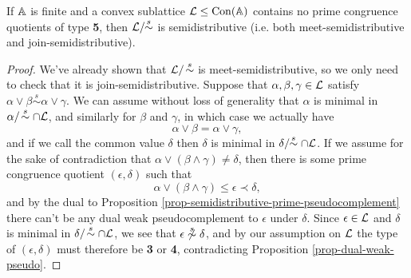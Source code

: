 \begin{appendices}
\begin{thm} If $\mathbb{A}$ is finite and a convex sublattice $\mathcal{L} \le \operatorname{Con}(\mathbb{A})$ contains no prime congruence quotients of type \textbf{5}, then $\mathcal{L}/\!\!\stackrel{s}{\sim}$ is semidistributive (i.e. both meet-semidistributive and join-semidistributive).
\end{thm}
\begin{proof} We've already shown that $\mathcal{L}/\!\stackrel{s}{\sim}$ is meet-semidistributive, so we only need to check that it is join-semidistributive. Suppose that $\alpha, \beta, \gamma \in \mathcal{L}$ satisfy $\alpha \vee \beta \stackrel{s}{\sim} \alpha \vee \gamma$. We can assume without loss of generality that $\alpha$ is minimal in $\alpha/\!\stackrel{s}{\sim} \cap \mathcal{L}$, and similarly for $\beta$ and $\gamma$, in which case we actually have
\[
\alpha \vee \beta = \alpha \vee \gamma,
\]
and if we call the common value $\delta$ then $\delta$ is minimal in $\delta/\!\!\stackrel{s}{\sim} \cap \mathcal{L}$. If we assume for the sake of contradiction that $\alpha \vee (\beta \wedge \gamma) \ne \delta$, then there is some prime congruence quotient $(\epsilon,\delta)$ such that
\[
\alpha \vee (\beta \wedge \gamma) \le \epsilon \prec \delta,
\]
and by the dual to Proposition \ref{prop-semidistributive-prime-pseudocomplement} there can't be any dual weak pseudocomplement to $\epsilon$ under $\delta$. Since $\epsilon \in \mathcal{L}$ and $\delta$ is minimal in $\delta/\!\stackrel{s}{\sim} \cap \mathcal{L}$, we see that $\epsilon \not\stackrel{s}{\sim} \delta$, and by our assumption on $\mathcal{L}$ the type of $(\epsilon,\delta)$ must therefore be \textbf{3} or \textbf{4}, contradicting Proposition \ref{prop-dual-weak-pseudo}.
\end{proof}






\end{appendices}

